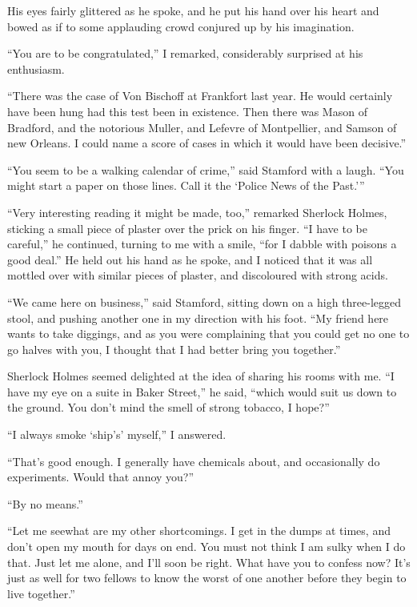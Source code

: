 \documentclass[12pt,english]{book}
\begin{document}
His eyes fairly glittered as he spoke, and he put his hand over his
heart and bowed as if to some applauding crowd conjured up by his
imagination.

{}``You are to be congratulated,'' I remarked, considerably surprised
at his enthusiasm.

{}``There was the case of Von Bischoff at Frankfort last year. He
would certainly have been hung had this test been in existence. Then
there was Mason of Bradford, and the notorious Muller, and Lefevre
of Montpellier, and Samson of new Orleans. I could name a score of
cases in which it would have been decisive.''

{}``You seem to be a walking calendar of crime,'' said Stamford
with a laugh. {}``You might start a paper on those lines. Call it
the `Police News of the Past.'''

{}``Very interesting reading it might be made, too,'' remarked Sherlock
Holmes, sticking a small piece of plaster over the prick on his finger.
{}``I have to be careful,'' he continued, turning to me with a smile,
{}``for I dabble with poisons a good deal.'' He held out his hand
as he spoke, and I noticed that it was all mottled over with similar
pieces of plaster, and discoloured with strong acids.

{}``We came here on business,'' said Stamford, sitting down on a
high three-legged stool, and pushing another one in my direction with
his foot. {}``My friend here wants to take diggings, and as you were
complaining that you could get no one to go halves with you, I thought
that I had better bring you together.''

Sherlock Holmes seemed delighted at the idea of sharing his rooms
with me. {}``I have my eye on a suite in Baker Street,'' he said,
{}``which would suit us down to the ground. You don't mind the smell
of strong tobacco, I hope?''

{}``I always smoke `ship's' myself,'' I answered.

{}``That's good enough. I generally have chemicals about, and occasionally
do experiments. Would that annoy you?''

{}``By no means.''

{}``Let me see\mdsh{---}what are my other shortcomings. I get in
the dumps at times, and don't open my mouth for days on end. You must
not think I am sulky when I do that. Just let me alone, and I'll soon
be right. What have you to confess now? It's just as well for two
fellows to know the worst of one another before they begin to live
together.''
\end{document}
